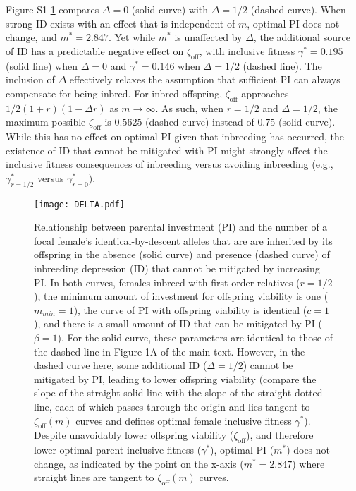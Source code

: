 \documentclass[12pt]{article}
\begin{document}
Figure S1-\ref{DELTA} compares $\Delta=0$ (solid curve) with $\Delta=1/2$ (dashed curve). When strong ID exists with an effect that is independent of $m$, optimal PI does not change, and $m^{*}=2.847$. Yet while $m^{*}$ is unaffected by $\Delta$, the additional source of ID has a predictable negative effect on $\zeta_{\textrm{off}}$, with inclusive fitness $\gamma^{*}=0.195$ (solid line) when $\Delta=0$ and $\gamma^{*}=0.146$ when $\Delta=1/2$ (dashed line). The inclusion of $\Delta$ effectively relaxes the assumption that sufficient PI can always compensate for being inbred. For inbred offspring, $\zeta_{\textrm{off}}$ approaches $1/2(1+r)(1 - \Delta r)$ as $m \to \infty$. As such, when $r=1/2$ and $\Delta=1/2$, the maximum possible $\zeta_{\textrm{off}}$ is $0.5625$ (dashed curve) instead of $0.75$ (solid curve). While this has no effect on optimal PI given that inbreeding has occurred, the existence of ID that cannot be mitigated with PI might strongly affect the inclusive fitness consequences of inbreeding versus avoiding inbreeding (e.g., $\gamma^{*}_{r=1/2}$ versus $\gamma^{*}_{r=0}$).

\begin{figure}
\begin{center}				
\texttt{[image: DELTA.pdf]}
\end{center}
\caption{Relationship between parental investment (PI) and the number of a focal female's identical-by-descent alleles that are are inherited by its offspring in the absence (solid curve) and presence (dashed curve) of inbreeding depression (ID) that cannot be mitigated by increasing PI. In both curves, females inbreed with first order relatives ($r=1/2$), the minimum amount of investment for offspring viability is one ($m_{min}=1$), the curve of PI with offspring viability is identical ($c=1$), and there is a small amount of ID that can be mitigated by PI ($\beta=1$). For the solid curve, these parameters are identical to those of the dashed line in Figure 1A of the main text. However, in the dashed curve here, some additional ID ($\Delta=1/2$) cannot be mitigated by PI, leading to lower offspring viability (compare the slope of the straight solid line with the slope of the straight dotted line, each of which passes through the origin and lies tangent to $\zeta_{\textrm{off}}(m)$ curves and defines optimal female inclusive fitness $\gamma^{*}$). Despite unavoidably lower offspring viability ($\zeta_{\textrm{off}}$), and therefore lower optimal parent inclusive fitness ($\gamma^{*}$), optimal PI ($m^{*}$) does not change, as indicated by the point on the x-axis ($m^{*}=2.847$) where straight lines are tangent to $\zeta_{\textrm{off}}(m)$ curves.}
\label{DELTA}
\end{figure}
\end{document}
